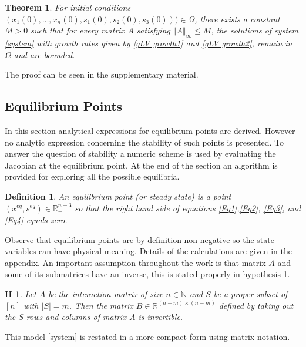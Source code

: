 \documentclass[3p,times]{article}
\newcommand{\N}{\mathbb{N}}
\newcommand{\R}{\mathbb{R}}
\newtheorem{defn}{Definition}
\newtheorem{hypo}{H}
\newtheorem{theo}{Theorem}
\begin{document}
\begin{theo}
	\label{theoWellPosedness}
	For initial conditions $(x_1(0),\dots,x_n(0),s_1(0),s_2(0),s_3(0)))\in \Omega$, there exists a constant $M>0$ such that for every matrix $A$ satisfying $\Vert A \Vert_{\infty} \leq M $, the solutions of system \eqref{system} with growth rates given by \eqref{gLV growth1} and \eqref{gLV growth2}, remain in $\Omega$ and are bounded.
\end{theo}

The proof can be seen in the supplementary material.

\subsection{Equilibrium Points}

In this section analytical expressions for equilibrium points are derived. However no analytic expression concerning the stability of such points is presented. To answer the question of stability a numeric scheme is used by evaluating the Jacobian at the equilibrium point. At the end of the section an algorithm is provided for exploring all the possible equilibria.

\begin{defn} 
	An equilibrium point (or steady state) is a point $(x^{eq},s^{eq}) \in \R^{n+3}_+$ so that the right hand side of equations \eqref{Eq1},\eqref{Eq2}, \eqref{Eq3}, and \eqref{Eq4} equals zero. 
\end{defn} 

Observe that equilibrium points are by definition non-negative so the state variables can have physical meaning. Details of the calculations are given in the appendix. An important assumption throughout the work is that matrix $A$ and some of its submatrices have an inverse, this is stated properly in hypothesis \ref{inverse hypothesis}.

\begin{hypo}
	Let $A$ be the interaction matrix of size $n \in \N$ and $S$ be a proper subset of $[n]$ with $|S| = m$. Then the matrix $B \in \R^{(n-m) \times (n-m)}$ defined by taking out the $S$ rows and columns of matrix $A$ is invertible.
	\label{inverse hypothesis}
\end{hypo} 

This model \eqref{system} is restated in a more compact form using matrix notation.
\end{document}
